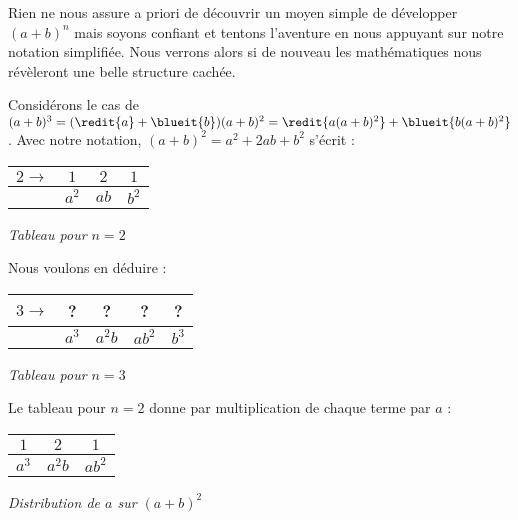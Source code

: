 Rien ne nous assure a priori de découvrir un moyen simple de développer $(a + b)^n$ mais soyons confiant et tentons l'aventure en nous appuyant sur notre notation simplifiée. Nous verrons alors si de nouveau les mathématiques nous révèleront une belle structure cachée.

\medskip

Considérons le cas de $(a + b)^3 = (\redit{a} + \blueit{b}) (a + b)^2 = \redit{a (a + b)^2} + \blueit{b (a + b)^2}$ . Avec notre notation, $(a + b)^2 = a^2 + 2 a b + b^2$ s'écrit :

\medskip
\begin{center}
\begin{tabular}{|l*{3}{|c}|}
	\hline
	$2 \rightarrow$
		& $1$    &  $2$    &  $1$
	\\ \hline
		& $a^2$  &  $a b$  &  $b^2$
	\\ \hline
\end{tabular}

\smallskip
\itshape\small
Tableau pour $n = 2$
\end{center}

\medskip

Nous voulons en déduire :

\medskip
\begin{center}
\begin{tabular}{|l*{4}{|c}|}
	\hline
	$3 \rightarrow$
		& ?      &  ?        &  ?        &  ?
	\\ \hline
		& $a^3$  &  $a^2 b$  &  $a b^2$  &  $b^3$
	\\ \hline
\end{tabular}

\smallskip
\itshape\small
Tableau pour $n = 3$
\end{center}


\medskip

Le tableau pour $n = 2$ donne par multiplication de chaque terme par $a$ :

\medskip
\begin{center}
\begin{tabular}{*{3}{|c}|}
	\hline
		$1$    &  $2$      &  $1$
	\\ \hline
		$a^3$  &  $a^2 b$  &  $a b^2$
	\\ \hline
\end{tabular}

\smallskip
\itshape\small
Distribution de $a$ sur $(a + b)^2$
\end{center}


\medskip

